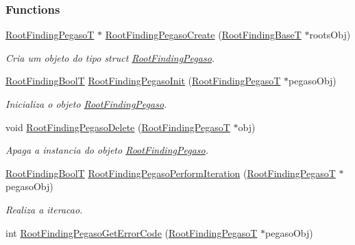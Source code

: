 \subsubsection*{Functions}
\begin{CompactItemize}
\item 
\hyperlink{structRootFindingPegaso}{RootFindingPegasoT} $\ast$ \hyperlink{group____pegaso_g1717ab621ccdb5d78bc3133ad52805c2}{RootFindingPegasoCreate} (\hyperlink{structRootFindingBase}{RootFindingBaseT} $\ast$rootsObj)
\begin{CompactList}\small\item\em Cria um objeto do tipo struct \hyperlink{structRootFindingPegaso}{RootFindingPegaso}. \item\end{CompactList}\item 
\hyperlink{RootFindingCommon_8h_31228d356f5429fa5ba7f206e4dee12f}{RootFindingBoolT} \hyperlink{group____pegaso_gf4d7f58905c8f5ed3ed3feb77c71b7cc}{RootFindingPegasoInit} (\hyperlink{structRootFindingPegaso}{RootFindingPegasoT} $\ast$pegasoObj)
\begin{CompactList}\small\item\em Inicializa o objeto \hyperlink{structRootFindingPegaso}{RootFindingPegaso}. \item\end{CompactList}\item 
void \hyperlink{group____pegaso_gea8cce31a68dcb1d7b2aa3e48d114366}{RootFindingPegasoDelete} (\hyperlink{structRootFindingPegaso}{RootFindingPegasoT} $\ast$obj)
\begin{CompactList}\small\item\em Apaga a instancia do objeto \hyperlink{structRootFindingPegaso}{RootFindingPegaso}. \item\end{CompactList}\item 
\hyperlink{RootFindingCommon_8h_31228d356f5429fa5ba7f206e4dee12f}{RootFindingBoolT} \hyperlink{group____pegaso_g983282553d9cd96ebd2155b5f939aada}{RootFindingPegasoPerformIteration} (\hyperlink{structRootFindingPegaso}{RootFindingPegasoT} $\ast$pegasoObj)
\begin{CompactList}\small\item\em Realiza a iteracao. \item\end{CompactList}\item 
int \hyperlink{group____pegaso_g6b27d39dab4f225185c07eb6fbb22ff9}{RootFindingPegasoGetErrorCode} (\hyperlink{structRootFindingPegaso}{RootFindingPegasoT} $\ast$pegasoObj)

\end{CompactItemize}

